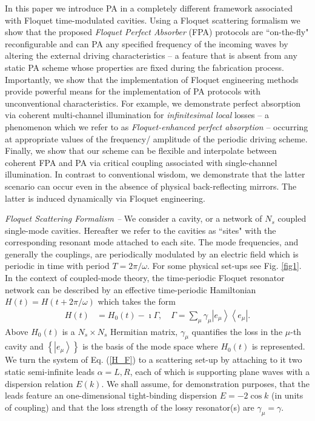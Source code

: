 \documentclass[aps,prl,twocolumn,showpacs,groupedaddress,amsmath,amssymb]{revtex4}
\begin{document}
In this paper we introduce PA in a completely different framework associated with Floquet time-modulated cavities. Using a 
Floquet scattering formalism we show that the proposed {\it Floquet Perfect Absorber} (FPA) protocols are ``on-the-fly" reconfigurable 
and can PA any specified frequency of the incoming waves by altering the external driving characteristics --  a feature that is absent 
from any static PA scheme whose properties are fixed during the fabrication process. Importantly, we show that the implementation 
of Floquet engineering methods provide powerful means for the implementation of PA protocols with unconventional characteristics. 
For example, we demonstrate perfect absorption via coherent multi-channel illumination for {\it infinitesimal local} losses -- a 
phenomenon which we refer to as {\it Floquet-enhanced perfect absorption} -- occurring at appropriate values of the frequency/
amplitude of the periodic driving scheme. Finally, we show that our scheme can be flexible and interpolate between coherent FPA
and PA via critical coupling associated with single-channel illumination. In contrast to conventional wisdom, we demonstrate that the
latter scenario can occur even in the absence of physical back-reflecting mirrors. The latter is induced dynamically via Floquet engineering.

{\it Floquet Scattering Formalism --} We consider a cavity, or a network of $N_s$ coupled single-mode cavities. Hereafter we refer 
to the cavities as ``sites" with the corresponding resonant mode attached to each site. The mode frequencies, and generally the couplings, 
are periodically modulated by an electric field which is periodic in time with period $T=2\pi/\omega$. For some
physical set-ups see Fig. \ref{fig1}. In the context of coupled-mode theory, the time-periodic Floquet resonator network can be described 
by an effective time-periodic Hamiltonian $H\left(t\right)=H\left(t+2\pi/\omega\right)$ which takes the form
\begin{align}
H\left(t\right) & =H_{0}\left(t\right)-\imath\Gamma,\quad\Gamma=\sum_{\mu}\gamma_{\mu}\left|e_{\mu}\right\rangle \left\langle 
e_{\mu}\right|.
\label{H_F}
\end{align}
Above $H_{0}\left(t\right)$ is a $N_{s}\times N_{s}$ Hermitian matrix, $\gamma_{\mu}$ quantifies the loss in the $\mu$-th cavity and 
$\left\{ \left|e_{\mu}\right\rangle \right\}$ is the basis of the mode space where $H_{0}\left(t\right)$ is represented. We turn the system 
of Eq. (\ref{H_F}) to a scattering set-up by attaching to it two static semi-infinite leads $\alpha = L, R$, each of which is supporting
plane waves with a dispersion relation $E(k)$. We shall assume, for demonstration purposes, that the leads feature an one-dimensional 
tight-binding dispersion $E=-2\cos k$ (in units of coupling) and that the loss strength of the lossy resonator(s) are $\gamma_{\mu}=
\gamma$. 
\end{document}
